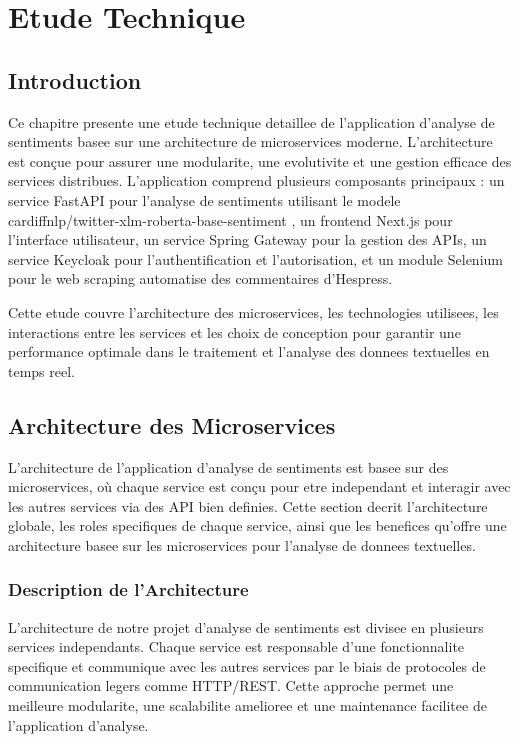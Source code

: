 \chapter{Etude Technique}

\section{Introduction}

Ce chapitre presente une etude technique detaillee de l'application d'analyse de sentiments basee sur une architecture de microservices moderne. L'architecture est conçue pour assurer une modularite, une evolutivite et une gestion efficace des services distribues. L'application comprend plusieurs composants principaux : un service FastAPI pour l'analyse de sentiments utilisant le modele cardiffnlp/twitter-xlm-roberta-base-sentiment \cite{10}, un frontend Next.js pour l'interface utilisateur, un service Spring Gateway pour la gestion des APIs, un service Keycloak pour l'authentification et l'autorisation, et un module Selenium pour le web scraping automatise des commentaires d'Hespress.

Cette etude couvre l'architecture des microservices, les technologies utilisees, les interactions entre les services et les choix de conception pour garantir une performance optimale dans le traitement et l'analyse des donnees textuelles en temps reel.

\section{Architecture des Microservices}

L'architecture de l'application d'analyse de sentiments est basee sur des microservices, où chaque service est conçu pour etre independant et interagir avec les autres services via des API bien definies. Cette section decrit l'architecture globale, les roles specifiques de chaque service, ainsi que les benefices qu'offre une architecture basee sur les microservices pour l'analyse de donnees textuelles.

\subsection{Description de l'Architecture}

L'architecture de notre projet d'analyse de sentiments est divisee en plusieurs services independants. Chaque service est responsable d'une fonctionnalite specifique et communique avec les autres services par le biais de protocoles de communication legers comme HTTP/REST. Cette approche permet une meilleure modularite, une scalabilite amelioree et une maintenance facilitee de l'application d'analyse.

